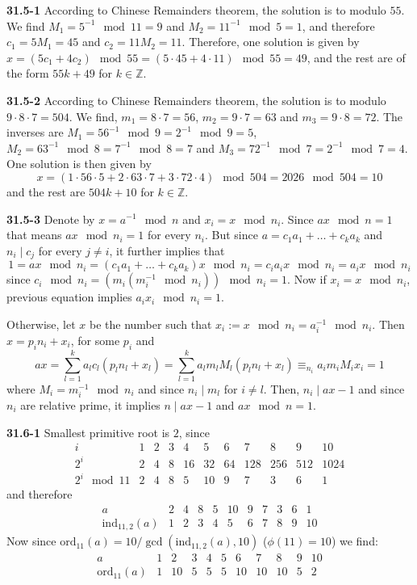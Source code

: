 \documentclass[12pt]{amsart}
\numberwithin{equation}{section}
\newcommand{\Z}{\mathbb{Z}}
\renewcommand{\(}{\left(}
\renewcommand{\)}{\right)}
\renewcommand{\[}{\left[}
\renewcommand{\]}{\right]}
\begin{document}
\pagestyle{empty}

\noindent \textbf{31.5-1} According to Chinese Remainders theorem, the solution is to modulo $55$. We find $M_1 = 5^{-1} \mod 11 = 9$ and $M_2 = 11^{-1} \mod 5 = 1$, and therefore $c_1=5M_1=45$ and $c_2=11M_2=11$. Therefore, one solution is given by $x = (5c_1 + 4c_2) \mod 55= (5\cdot 45+4\cdot 11)\mod 55 =49$, and the rest are of the form $55k+49$ for $k\in \Z$.

\bigskip

\noindent \textbf{31.5-2} According to Chinese Remainders theorem, the solution is to modulo $9\cdot 8\cdot 7 = 504$. We find, $m_1=8\cdot 7=56$, $m_2=9\cdot 7=63$ and $m_3=9\cdot 8=72$. The inverses are $M_1 = 56^{-1} \mod 9= 2^{-1} \mod 9 = 5$, $M_2=63^{-1} \mod 8 = 7^{-1} \mod 8=7$ and $M_3=72^{-1} \mod 7 = 2^{-1} \mod 7=4$. One solution is then given by
$$
x=(1\cdot 56 \cdot 5 + 2 \cdot 63 \cdot 7 + 3 \cdot 72 \cdot 4) \mod 504 = 2026 \mod 504 = 10
$$
and the rest are $504k+10$ for $k\in \Z$.

\bigskip

\noindent \textbf{31.5-3} Denote by $x=a^{-1} \mod n$ and $x_i = x \mod n_i$. Since $ax \mod n = 1$ that means $ax \mod n_i=1$ for every $n_i$. But since $a=c_1a_1+\ldots+c_ka_k$ and $n_i \mid c_j$ for every $j\neq i$, it further implies that
$$
1=ax \mod n_i = (c_1a_1+\ldots+c_ka_k)x\mod n_i = c_ia_ix \mod n_i = a_ix \mod n_i
$$
since $c_i\mod n_i = (m_i(m_i^{-1} \mod n_i)) \mod n_i = 1$. Now if $x_i = x\mod n_i$, previous equation implies $a_ix_i \mod n_i=1$.

\medskip

Otherwise, let $x$ be the number such that $x_i:=x\mod n_i = a_i^{-1} \mod n_i$. Then $x=p_in_i+x_i$, for some $p_i$ and
$$
ax = \sum_{l=1}^k a_lc_l(p_ln_l+x_l)= \sum_{l=1}^k a_lm_lM_l(p_ln_l+x_l) \equiv_{n_i} a_im_iM_ix_i=1
$$
where $M_i = m_i^{-1} \mod n_i$ and since $n_i \mid m_l$ for $i\neq l$. Then, $n_i \mid ax-1$ and since $n_i$ are relative prime, it implies $n\mid ax-1$ and $ax\mod n=1$.

\bigskip

\noindent \textbf{31.6-1} Smallest primitive root is $2$, since
$$
\begin{array}{ccccccccccc}
i&  1 & 2 & 3 & 4 & 5 & 6 & 7 & 8 & 9 & 10 \\
2^i& 2 & 4 & 8 & 16 & 32 & 64 & 128 & 256 & 512 & 1024 \\
2^i \mod 11 & 2 & 4 & 8 & 5 & 10 & 9 & 7 & 3 & 6 & 1
\end{array}
$$
and therefore
$$
\begin{array}{ccccccccccc}
a & 2 & 4 & 8 & 5 & 10 & 9 & 7 & 3 & 6 & 1 \\
\mathrm{ind}_{11,2}(a)&  1 & 2 & 3 & 4 & 5 & 6 & 7 & 8 & 9 & 10
\end{array}
$$
Now since $\mathrm{ord}_{11}(a) = 10/\gcd(\mathrm{ind}_{11,2}(a),10)$ ($\phi(11)=10$) we find:
$$
\begin{array}{ccccccccccc}
a&  1 & 2 & 3 & 4 & 5 & 6 & 7 & 8 & 9 & 10 \\
\mathrm{ord}_{11}(a)& 1 & 10 & 5 & 5 & 5 & 10 & 10 & 10 & 5 & 2
\end{array}
$$
\end{document}
